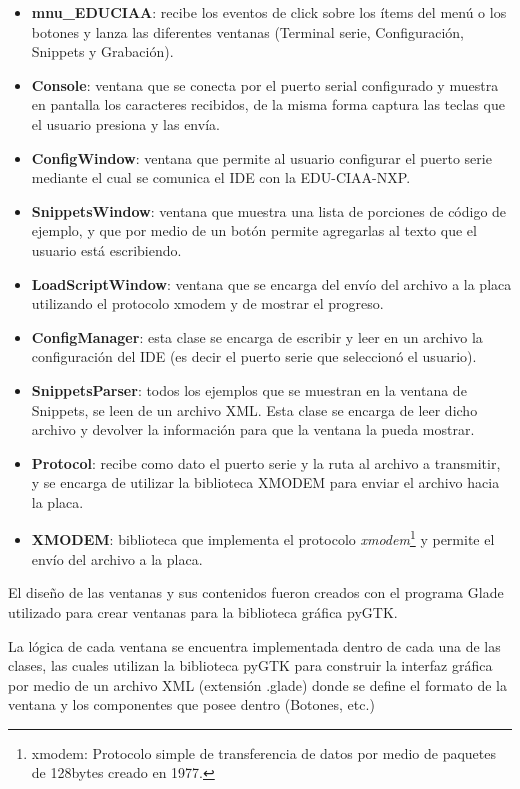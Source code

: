 \begin{itemize}
	\item \textbf{mnu\_EDUCIAA}: recibe los eventos de click sobre los ítems del menú o los botones y lanza las diferentes ventanas (Terminal serie, Configuración, Snippets y Grabación).
	\item \textbf{Console}: ventana que se conecta por el puerto serial configurado y muestra en pantalla los caracteres recibidos, de la misma forma captura las teclas que el usuario presiona y las envía.
	\item \textbf{ConfigWindow}: ventana que permite al usuario configurar el puerto serie mediante el cual se comunica el IDE con la EDU-CIAA-NXP.
	\item \textbf{SnippetsWindow}: ventana que muestra una lista de porciones de código de ejemplo, y que por medio de un botón permite agregarlas al texto que el usuario está escribiendo.
	\item \textbf{LoadScriptWindow}: ventana que se encarga del envío del archivo a la placa utilizando el protocolo xmodem y de mostrar el progreso.
	\item \textbf{ConfigManager}: esta clase se encarga de escribir y leer en un archivo la configuración del IDE (es decir el puerto serie que seleccionó el usuario).
	\item \textbf{SnippetsParser}: todos los ejemplos que se muestran en la ventana de Snippets, se leen de un archivo XML. Esta clase se encarga de leer dicho archivo y devolver la información para que la ventana la pueda mostrar.	
	\item \textbf{Protocol}: recibe como dato el puerto serie y la ruta al archivo a transmitir, y se encarga de utilizar la biblioteca XMODEM para enviar el archivo hacia la placa.
	\item \textbf{XMODEM}: biblioteca que implementa el protocolo \textit{xmodem}\footnote{xmodem: Protocolo simple de transferencia de datos por medio de paquetes de 128bytes creado en 1977.} y permite el envío del archivo a la placa.	
\end{itemize}

El diseño de las ventanas y sus contenidos fueron creados con el programa Glade\cite{glade} utilizado para crear ventanas para la biblioteca gráfica pyGTK.

La lógica de cada ventana se encuentra implementada dentro de cada una de las clases, las cuales utilizan la biblioteca pyGTK para construir la interfaz gráfica por medio de un archivo XML (extensión .glade) donde se define el formato de la ventana y los componentes que posee dentro (Botones, etc.)


